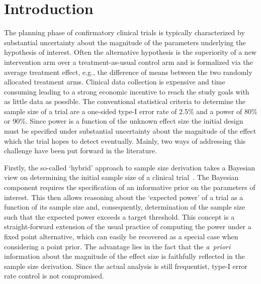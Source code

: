 \documentclass[12pt]{article}
\begin{document}
\newpage

\section{Introduction}
\label{sec:introduction}

The planning phase of confirmatory clinical trials is typically
characterized by substantial uncertainty about the magnitude of the
parameters underlying the hypothesis of interest.
Often the alternative hypothesis is the superiority of a new intervention arm
over a treatment-as-usual control arm and is formalized via
the average treatment effect, e.g., the difference of means between the
two randomly allocated treatment arms.
Clinical data collection is expensive and time consuming leading to a
strong economic incentive to reach the study goals with as little data as possible.
The conventional statistical criteria to determine the sample size of a trial
are a one-sided type-I error rate of
2.5\% and a power of 80\% or 90\%.
Since power is a function of the unknown effect size the initial design
must be specified under substantial uncertainty about the magnitude of the effect which the trial hopes to detect eventually.
Mainly, two ways of addressing this challenge have been put forward in the literature.

Firstly, the so-called `hybrid' approach to sample size
derivation takes a Bayesian
view on determining the initial sample size of a clinical trial~\cite{spiegelhalter1994}.
The Bayesian component requires the specification of an informative
prior on the parameters of interest.
This then allows reasoning about the `expected power' of a trial as a
function of its sample size and, consequently, determination of the sample size
such that the expected power exceeds a target threshold.
This concept is a straight-forward extension of the usual practice of
computing the power under a fixed point alternative, which can easily be recovered as a special case when considering a point prior.
The advantage lies in the fact that the \textit{a~priori} information about the magnitude of the effect size is faithfully
reflected in the sample size derivation.
Since the actual analysis is still frequentist, type-I error rate control is not compromised.
\end{document}
